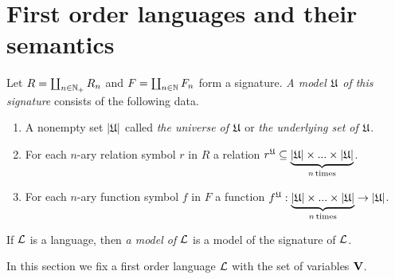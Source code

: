 \section{First order languages and their semantics}

\begin{definition}
Let $R = \coprod_{n\in {\mathbb N}_+}R_n$ and $F = \coprod_{n\in {\mathbb N}}F_n$ form a signature. \textit{A model ${\mathfrak U}$ of this signature} consists of the following data.
\begin{enumerate}[label=\textbf{(\arabic*)}, leftmargin=3.0em]
\item A nonempty set $|{\mathfrak U}|$ called \textit{the universe of ${\mathfrak U}$} or \textit{the underlying set of ${\mathfrak U}$}.
\item For each $n$-ary relation symbol $r$ in $R$ a relation $r^{\mathfrak U} \subseteq \underbrace{|{\mathfrak U}| \times ... \times |{\mathfrak U}|}_{n\,\mathrm{times}}$.
\item For each $n$-ary function symbol $f$ in $F$ a function $f^{\mathfrak U}:\underbrace{|{\mathfrak U}| \times ... \times |{\mathfrak U}|}_{n\,\mathrm{times}} \rightarrow |{\mathfrak U}|$.
\end{enumerate}
If ${\mathcal L}$ is a language, then \textit{a model of ${\mathcal L}$} is a model of the signature of ${\mathcal L}$.
\end{definition}
\noindent
In this section we fix a first order language ${\mathcal L}$ with the set of variables $\mathbf{V}$.

